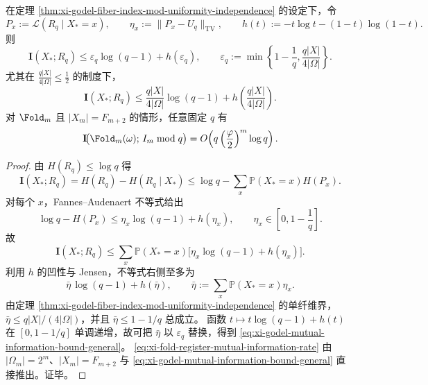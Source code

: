 \begin{theorem}[外置寄存器的信息屏蔽上界]\label{thm:xi-godel-register-mutual-information-bound}
在定理 \ref{thm:xi-godel-fiber-index-mod-uniformity-independence} 的设定下，令
\[
P_x:=\mathcal L(R_q\mid X_\ast=x),\qquad
\eta_x:=\|P_x-U_q\|_{\mathrm{TV}},
\qquad
h(t):=-t\log t-(1-t)\log(1-t).
\]
则
\begin{equation}\label{eq:xi-godel-mutual-information-bound-general}
\mathbf I(X_\ast;R_q)
\le
\varepsilon_q\log(q-1)+h(\varepsilon_q),
\qquad
\varepsilon_q:=\min\!\left\{1-\frac1q,\frac{q|X|}{4|\Omega|}\right\}.
\end{equation}
尤其在
\(
\frac{q|X|}{4|\Omega|}\le \frac12
\)
的制度下，
\[
\mathbf I(X_\ast;R_q)
\le
\frac{q|X|}{4|\Omega|}\log(q-1)
+h\!\left(\frac{q|X|}{4|\Omega|}\right).
\]
对 \(\Fold_m\) 且 \(|X_m|=F_{m+2}\) 的情形，任意固定 \(q\) 有
\begin{equation}\label{eq:xi-fold-register-mutual-information-rate}
\mathbf I\!\bigl(\Fold_m(\omega);\,I_m\bmod q\bigr)
=
O\!\left(q\left(\frac{\varphi}{2}\right)^m\log q\right).
\end{equation}
\end{theorem}
\begin{proof}
由 \(H(R_q)\le\log q\) 得
\[
\mathbf I(X_\ast;R_q)
=H(R_q)-H(R_q\mid X_\ast)
\le \log q-\sum_{x}\mathbb P(X_\ast=x)H(P_x).
\]
对每个 \(x\)，Fannes--Audenaert 不等式给出
\[
\log q-H(P_x)\le \eta_x\log(q-1)+h(\eta_x),
\qquad
\eta_x\in\left[0,1-\frac1q\right].
\]
故
\[
\mathbf I(X_\ast;R_q)
\le
\sum_x\mathbb P(X_\ast=x)\bigl[\eta_x\log(q-1)+h(\eta_x)\bigr].
\]
利用 \(h\) 的凹性与 Jensen，不等式右侧至多为
\[
\bar\eta\,\log(q-1)+h(\bar\eta),
\qquad
\bar\eta:=\sum_x\mathbb P(X_\ast=x)\eta_x.
\]
由定理 \ref{thm:xi-godel-fiber-index-mod-uniformity-independence} 的单纤维界，
\(
\bar\eta\le q|X|/(4|\Omega|)
\)，并且 \(\bar\eta\le 1-1/q\) 总成立。
函数 \(t\mapsto t\log(q-1)+h(t)\) 在 \([0,1-1/q]\) 单调递增，故可把 \(\bar\eta\) 以 \(\varepsilon_q\) 替换，得到
\eqref{eq:xi-godel-mutual-information-bound-general}。
\eqref{eq:xi-fold-register-mutual-information-rate}
由 \(|\Omega_m|=2^m\)、\(|X_m|=F_{m+2}\) 与
\eqref{eq:xi-godel-mutual-information-bound-general}
直接推出。证毕。
\end{proof}

